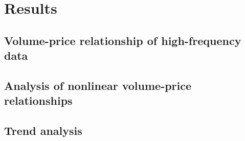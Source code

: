 \documentclass{elsarticle}
\begin{document}
\section{Results}
\subsection{Volume-price relationship of high-frequency data}

%



\subsection{Analysis of nonlinear volume-price relationships}




\subsection{Trend analysis}
%
%
\end{document}
